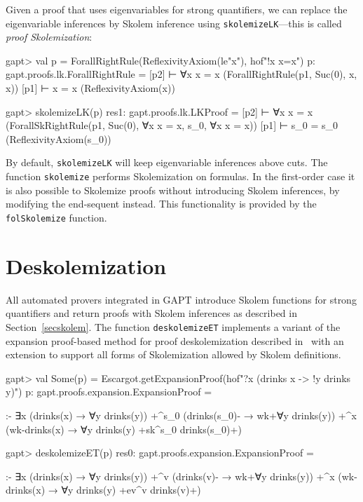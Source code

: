 \documentclass[a4paper,11pt]{book}
\begin{document}
Given a proof that uses eigenvariables for strong quantifiers, we can replace
the eigenvariable inferences by Skolem inference using
\texttt{skolemizeLK}---this is called \emph{proof Skolemization}:
\begin{clilisting}
gapt> val p = ForallRightRule(ReflexivityAxiom(le"x"), hof"!x x=x")
p: gapt.proofs.lk.ForallRightRule =
[p2]  ⊢ ∀x x = x    (ForallRightRule(p1, Suc(0), x, x))
[p1]  ⊢ x = x    (ReflexivityAxiom(x))

gapt> skolemizeLK(p)
res1: gapt.proofs.lk.LKProof =
[p2]  ⊢ ∀x x = x    (ForallSkRightRule(p1, Suc(0), ∀x x = x, s_0, ∀x x = x))
[p1]  ⊢ s_0 = s_0    (ReflexivityAxiom(s_0))

\end{clilisting}

By default, \texttt{skolemizeLK} will keep eigenvariable inferences above cuts.
The function \texttt{skolemize} performs Skolemization on formulas.
In the first-order case it is also possible to Skolemize proofs without
introducing Skolem inferences, by modifying the end-sequent instead.  This
functionality is provided by the \texttt{folSkolemize} function.

\section{Deskolemization}

All automated provers integrated in GAPT introduce Skolem functions for strong
quantifiers and return proofs with Skolem inferences as described in
Section~\ref{secskolem}.  The function \texttt{deskolemizeET} implements a
variant of the expansion proof-based method for proof deskolemization
described in~\cite{Baaz2012Complexity} with an extension to support all forms
of Skolemization allowed by Skolem definitions.
\begin{clilisting}
gapt> val Some(p) = Escargot.getExpansionProof(hof"?x (drinks x -> !y drinks y)")
p: gapt.proofs.expansion.ExpansionProof =

:-
∃x (drinks(x) → ∀y drinks(y))
  +^{s_0} (drinks(s_0)- → wk+{∀y drinks(y)})
  +^{x} (wk-{drinks(x)} → ∀y drinks(y) +sk^{s_0} drinks(s_0)+)

gapt> deskolemizeET(p)
res0: gapt.proofs.expansion.ExpansionProof =

:-
∃x (drinks(x) → ∀y drinks(y))
  +^{v} (drinks(v)- → wk+{∀y drinks(y)})
  +^{x} (wk-{drinks(x)} → ∀y drinks(y) +ev^{v} drinks(v)+)

\end{clilisting}
\end{document}
